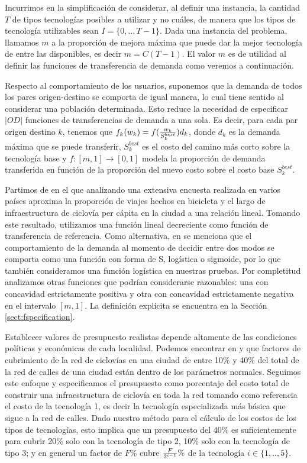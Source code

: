 Incurrimos en la simplificación de considerar, al definir una instancia, la cantidad $T$ de tipos tecnologías posibles a utilizar y no cuáles, de manera que los tipos de tecnología utilizables sean $I = \{0,.., T - 1\}$. Dada una instancia del problema, llamamos $m$ a la proporción de mejora máxima que puede dar la mejor tecnología de entre las disponibles, es decir $m = C(T - 1)$. El valor $m$ es de utilidad al definir las funciones de transferencia de demanda como veremos a continuación.

Respecto al comportamiento de los usuarios, suponemos que la demanda de todos los pares origen-destino se comporta de igual manera, lo cual tiene sentido al considerar una población determinada. Esto reduce la necesidad de especificar $|OD|$ funciones de transferencias de demanda a una sola. Es decir, para cada par origen destino $k$, tenemos que $f_k(w_k) = f({w_k \over S^{best}_k})d_k$, donde $d_k$ es la demanda máxima que se puede transferir, $S^{best}_k$ es el costo del camino más corto sobre la tecnología base y $f: [m, 1] \rightarrow [0, 1]$ modela la proporción de demanda transferida en función de la proporción del nuevo costo sobre el costo base $S^{best}_k$.

Partimos de \textcite{shwe2014} en el que analizando una extensiva encuesta realizada en varios países aproxima la proporción de viajes hechos en bicicleta y el largo de infraestructura de ciclovía per cápita en la ciudad a una relación lineal. Tomando este resultado, utilizamos una función lineal decreciente como función de transferencia de referencia. Como alternativa, en \textcite{ortuz2011} se menciona que el comportamiento de la demanda al momento de decidir entre dos modos se comporta como una función con forma de S, logística o sigmoide, por lo que también consideramos una función logística en nuestras pruebas. Por completitud analizamos otras funciones que podrían considerarse razonables: una con concavidad estrictamente positiva y otra con concavidad estrictamente negativa en el intervalo $[m, 1]$. La definición explícita se encuentra en la Sección \ref{sect:fspecification}.

Establecer valores de presupuesto realistas depende altamente de las condiciones políticas y económicas de cada localidad. Podemos encontrar en \textcite{rios2015} y \textcite{shwe2014} que factores de cubrimiento de la red de ciclovías en una ciudad de entre 10\% y 40\% del total de la red de calles de una ciudad están dentro de los parámetros normales. Seguimos este enfoque y especificamos el presupuesto como porcentaje del costo total de construir una infraestructura de ciclovía en toda la red tomando como referencia el costo de la tecnología 1, es decir la tecnología especializada más básica que sigue a la red de calles. Dado nuestro método para el cálculo de los costos de los tipos de tecnologías, esto implica que un presupuesto del 40\% es suficientemente para cubrir 20\% solo con la tecnología de tipo 2, 10\% solo con la tecnología de tipo 3; y en general un factor de $F\%$ cubre ${F \over {2^{i - 1}}}\%$ de la tecnología $i \in \{1,..,5\}$.

